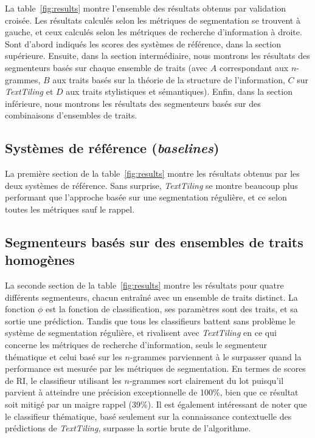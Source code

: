 La table~\ref{fig:results} montre l'ensemble des résultats obtenus par validation croisée. Les résultats calculés selon les métriques de segmentation se trouvent à gauche, et ceux calculés selon les métriques de recherche d'information à droite. Sont d'abord indiqués les scores des systèmes de référence, dans la section supérieure. Ensuite, dans la section intermédiaire, nous montrons les résultats des segmenteurs basés sur chaque ensemble de traits (avec $A$ correspondant aux $n$-grammes, $B$ aux traits basés sur la théorie de la structure de l'information, $C$ sur \textit{TextTiling} et $D$ aux traits stylistiques et sémantiques). Enfin, dans la section inférieure, nous montrons les résultats des segmenteurs basés sur des combinaisons d'ensembles de traits.

\subsection{Systèmes de référence (\textit{baselines})}

La première section de la table~\ref{fig:results} montre les résultats obtenus par les deux systèmes de référence. Sans surprise, \textit{TextTiling} se montre beaucoup plus performant que l'approche basée sur une segmentation régulière, et ce selon toutes les métriques sauf le rappel.

\subsection{Segmenteurs basés sur des ensembles de traits homogènes}

La seconde section de la table~\ref{fig:results} montre les résultats pour quatre différents segmenteurs, chacun entraîné avec un ensemble de traits distinct. La fonction $\phi$ est la fonction de classification, ses paramètres sont des traits, et sa sortie une prédiction. Tandis que tous les classifieurs battent sans problème le système de segmentation régulière, et rivalisent avec \textit{TextTiling} en ce qui concerne les métriques de recherche d'information, seuls le segmenteur thématique et celui basé sur les $n$-grammes parviennent à le surpasser quand la performance est mesurée par les métriques de segmentation. En termes de scores de RI, le classifieur utilisant les $n$-grammes sort clairement du lot puisqu'il parvient à atteindre une précision exceptionnelle de 100\%, bien que ce résultat soit mitigé par un maigre rappel (39\%). Il est également intéressant de noter que le classifieur thématique, basé seulement sur la connaissance contextuelle des prédictions de \textit{TextTiling}, surpasse la sortie brute de l'algorithme.

